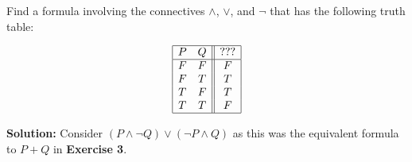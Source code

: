 Find a formula involving the connectives $\wedge$, $\vee$, and $\neg$ that has the following truth table:

\[
\begin{array}{|cc||c|}
\hline
P & Q & ??? \\
\hline
F & F & F \\
F & T & T \\
T & F & T \\
T & T & F \\
\hline
\end{array}
\]

\textbf{Solution:}  Consider $(P \wedge \neg Q) \vee (\neg P \wedge Q)$ as this was the equivalent formula to $P + Q$ in \textbf{Exercise 3}.

\pagebreak